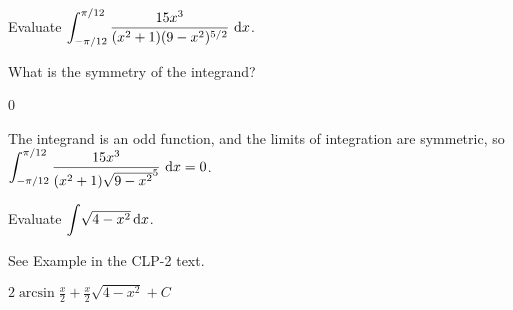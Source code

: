 \begin{question}
Evaluate $\displaystyle\int_{-\pi/12}^{\pi/12} \dfrac{15x^3}{(x^2+1)(9-x^2)^{5/2}}~\mathrm{d}x$.
\end{question}
\begin{hint}
What is the symmetry of the integrand?
\end{hint}
\begin{answer}
0
\end{answer}
\begin{solution}
The integrand is an odd function, and the limits of integration are symmetric, so 
$\displaystyle\int_{-\pi/12}^{\pi/12} \dfrac{15x^3}{(x^2+1)\sqrt{9-x^2}^5}~\mathrm{d}x=0$.
\end{solution}




\begin{question}[M121 2014A]
Evaluate ${\displaystyle\int} \sqrt{4-x^2}\,\mathrm{d}x$.
\end{question}

\begin{hint} 
See Example  in the CLP-2 text.
\end{hint}

\begin{answer} 
$\displaystyle2\arcsin\frac{x}{2}+\frac{x}{2}\sqrt{4-x^2}+ C$
\end{answer}

